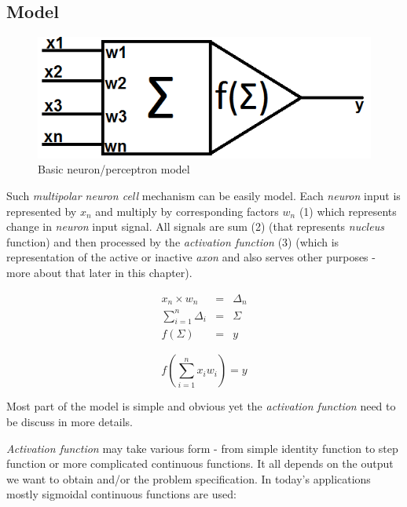 \newpage
\subsection{Model}

\begin{figure}[!h]
    \centering
    \includegraphics[scale=0.5]{Media/Neuron.png}
    \caption{Basic neuron/perceptron model}
    \label{fig:NeuronModel}
\end{figure}

Such \textit{multipolar neuron cell} mechanism can be easily model\cite{sRpNAI369}. Each \textit{neuron} input is represented by $x_n$ and multiply by corresponding factors $w_n$ (1) which represents change in \textit{neuron} input signal. All signals are sum (2) (that represents \textit{nucleus} function) and then processed by the \textit{activation function} (3) (which is representation of the active or inactive \textit{axon} and also serves other purposes - more about that later in this chapter).

\begin{eqnarray}
x_n \times w_n &=& \Delta_n \\
\sum\limits_{i=1}^n \Delta_i &=& \Sigma \\
f(\Sigma) &=& y
\end{eqnarray}

\begin{mycapequ}[!ht]
    $$f\left(\sum\limits_{i=1}^n x_iw_i\right) = y$$
    \caption{Basic neuron/perceptron model}
    \label{formula:NeuronMathModelEquation}
\end{mycapequ}

Most part of the model is simple and obvious yet the \textit{activation function} need to be discuss in more details.

\textit{Activation function} may take various form - from simple identity function to step function or more complicated continuous functions. It all depends on the output we want to obtain and/or the problem specification. In today's applications mostly sigmoidal continuous functions are used:

